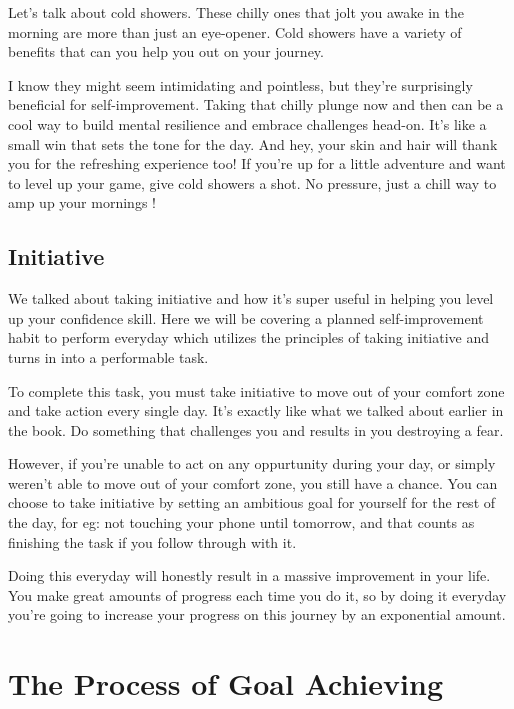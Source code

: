 \documentclass[
]{book}
\begin{document}
Let's talk about cold showers. These chilly ones that jolt you awake in the morning are more than just an eye-opener. Cold showers have a variety of benefits that can you help you out on your journey.

I know they might seem intimidating and pointless, but they're surprisingly beneficial for self-improvement. Taking that chilly plunge now and then can be a cool way to build mental resilience and embrace challenges head-on. It's like a small win that sets the tone for the day. And hey, your skin and hair will thank you for the refreshing experience too! If you're up for a little adventure and want to level up your game, give cold showers a shot. No pressure, just a chill way to amp up your mornings \citep{cold_showers}!

\hypertarget{initiative}{%
\section{Initiative}\label{initiative}}

We talked about taking initiative and how it's super useful in helping you level up your confidence skill. Here we will be covering a planned self-improvement habit to perform everyday which utilizes the principles of taking initiative and turns in into a performable task.

To complete this task, you must take initiative to move out of your comfort zone and take action every single day. It's exactly like what we talked about earlier in the book. Do something that challenges you and results in you destroying a fear.

However, if you're unable to act on any oppurtunity during your day, or simply weren't able to move out of your comfort zone, you still have a chance. You can choose to take initiative by setting an ambitious goal for yourself for the rest of the day, for eg: not touching your phone until tomorrow, and that counts as finishing the task if you follow through with it.

Doing this everyday will honestly result in a massive improvement in your life. You make great amounts of progress each time you do it, so by doing it everyday you're going to increase your progress on this journey by an exponential amount.

\hypertarget{the-process-of-goal-achieving}{%
\chapter{The Process of Goal Achieving}\label{the-process-of-goal-achieving}}
\end{document}
